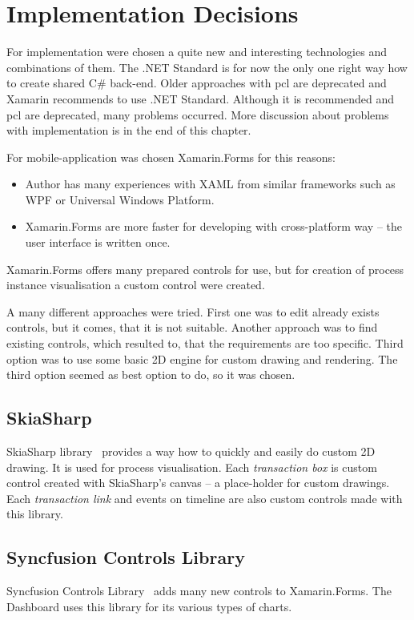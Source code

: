 \section{Implementation Decisions}
For implementation were chosen a quite new and interesting technologies and combinations of them.
The .NET Standard is for now the only one right way how to create shared C\# back-end. Older approaches with \gls{pcl} are deprecated and Xamarin recommends to use .NET Standard. Although it is recommended and \gls{pcl} are deprecated, many problems occurred. More discussion about problems with implementation is in the end of this chapter.

For mobile-application was chosen Xamarin.Forms for this reasons:
\begin{itemize}
\item Author has many experiences with XAML from similar frameworks such as WPF or Universal Windows Platform.
\item Xamarin.Forms are more faster for developing with cross-platform way -- the user interface is written once.
\end{itemize}

Xamarin.Forms offers many prepared controls for use, but for creation of process instance visualisation a custom control were created.  

A many different approaches were tried. First one was to edit already exists controls, but it comes, that it is not suitable. Another approach was to find existing controls, which resulted to, that the requirements are too specific. Third option was to use some basic 2D engine for custom drawing and rendering. The third option seemed as best option to do, so it was chosen. 
\subsection{SkiaSharp}
SkiaSharp library~\cite{skiasharp} provides a way how to quickly and easily do custom 2D drawing. It is used for process visualisation. Each \textit{transaction box} is custom control created with SkiaSharp's canvas -- a place-holder for custom drawings. Each \textit{transaction link} and events on timeline are also custom controls made with this library. 
\subsection{Syncfusion Controls Library}
Syncfusion Controls Library~\cite{syncfusion} adds many new controls to Xamarin.Forms. The Dashboard uses this library for its various types of charts. 
